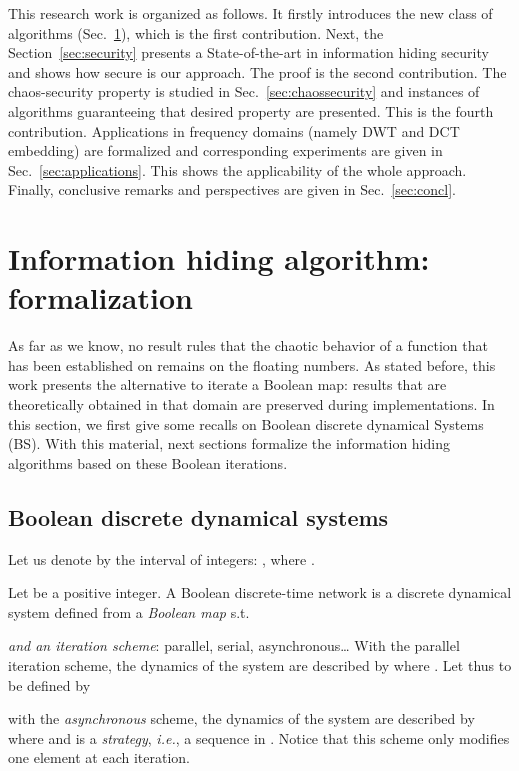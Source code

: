 \documentclass{comjnl}
\begin{document}
This research work is organized as follows.
It firstly introduces the new class of algorithms (Sec.~\ref{sec:formalization}), which is the first contribution.
Next, the Section~\ref{sec:security} presents a 
State-of-the-art  in information hiding security and shows how secure  
is our approach. The proof is the second contribution.
The chaos-security property is studied in Sec.~\ref{sec:chaossecurity}
and instances of algorithms guaranteeing that desired property are presented.
This is the fourth contribution. 
Applications in frequency domains (namely DWT and DCT embedding) 
are formalized and corresponding experiments are 
given in Sec.~\ref{sec:applications}. 
This shows the applicability of the whole approach.
Finally, conclusive remarks and perspectives are given in Sec.~\ref{sec:concl}.


\section{Information hiding algorithm: formalization}
\label{sec:formalization}

As far as we know, no result rules that the chaotic behavior of a function 
that has been established on  remains on the floating numbers.
As stated before, this work presents the alternative to iterate a Boolean map:
results that are theoretically obtained in that domain are preserved  
during implementations.
In this section, we first give some recalls on Boolean discrete
dynamical Systems (BS). With this material, next sections formalize the information hiding algorithms based on 
these Boolean iterations.




\subsection{Boolean discrete dynamical systems}\label{sub:bdds}



Let us denote by  the interval of integers:
, where . 


Let  be a positive integer. A Boolean discrete-time 
network is a discrete dynamical
system defined from a {\emph{Boolean map}}
 s.t. 

{\emph{and an iteration scheme}}: parallel, serial,
asynchronous\ldots 
With the parallel iteration scheme, 
the dynamics of the system are described by 
where .
Let thus  to  
be defined by

with the \emph{asynchronous} scheme,
the dynamics of the system are described by 
where  and  is a {\emph{strategy}}, \textit{i.e.}, a sequence 
in .
Notice that this scheme only modifies one element at each iteration.
\end{document}

